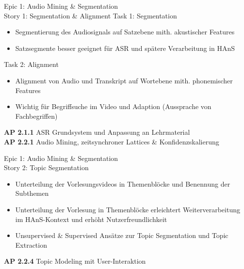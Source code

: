 \documentclass[aspectratio=169,xcolor=dvipsnames]{beamer}
\begin{document}
\begin{frame}{Epic 1: Audio Mining \& Segmentation\\
Story 1: Segmentation \& Alignment}
    Task 1: Segmentation
    \begin{itemize}
        \item 
        Segmentierung des Audiosignals auf Satzebene mith. akustischer Features
        
        \item
        Satzsegmente besser geeignet für ASR und spätere Verarbeitung in HAnS
        
    \end{itemize}

    Task 2: Alignment
    \begin{itemize}
        \item
        Alignment von Audio und Transkript auf Wortebene mith. phonemischer Features
        
        \item
        Wichtig für Begriffsuche im Video und Adaption (Aussprache von Fachbegriffen)
        
    \end{itemize}

\vfill    
\scriptsize \textbf{AP 2.1.1} ASR Grundsystem und Anpassung an Lehrmaterial\\
\textbf{AP 2.2.1} Audio Mining, zeitsynchroner Lattices \& Konfidenzskalierung 
\end{frame}


\begin{frame}{Epic 1: Audio Mining \& Segmentation\\
Story 2: Topic Segmentation}

    \begin{itemize}
        \item 
        Unterteilung der Vorlesungsvideos in Themenblöcke und Benennung der Subthemen
        
        \item
        Unterteilung der Vorlesung in Themenblöcke erleichtert Weiterverarbeitung im HAnS-Kontext und erhöht Nutzerfreundlichkeit
        
        \item
        Unsupervised \& Supervised Ansätze zur Topic Segmentation und Topic Extraction
        
    \end{itemize}

\vfill
\scriptsize \textbf{AP 2.2.4} Topic Modeling mit User-Interaktion
\end{frame}
\end{document}
